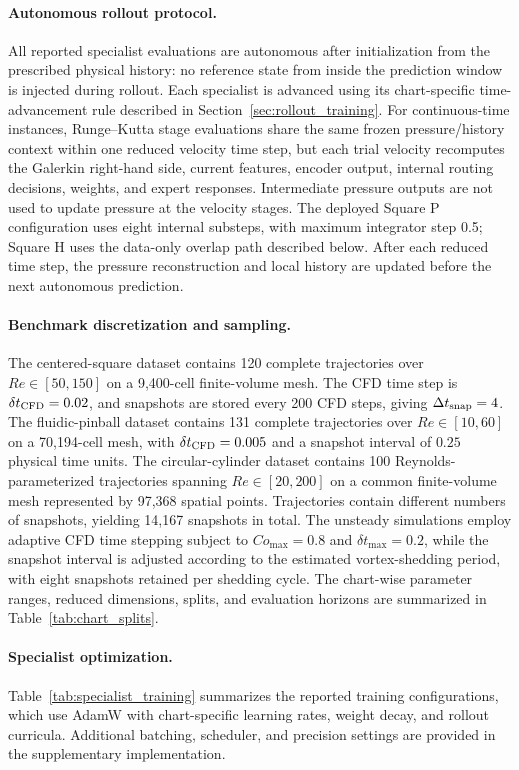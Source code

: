 \paragraph{Autonomous rollout protocol.}
All reported specialist evaluations are autonomous after initialization from the prescribed physical history: no reference state from inside the prediction window is injected during rollout.
Each specialist is advanced using its chart-specific time-advancement rule described in Section~\ref{sec:rollout_training}. For continuous-time instances, Runge--Kutta stage evaluations share the same frozen pressure/history context within one reduced velocity time step, but each trial velocity recomputes the Galerkin right-hand side, current features, encoder output, internal routing decisions, weights, and expert responses. Intermediate pressure outputs are not used to update pressure at the velocity stages. The deployed Square P configuration uses eight internal substeps, with maximum integrator step 0.5; Square H uses the data-only overlap path described below. After each reduced time step, the pressure reconstruction and local history are updated before the next autonomous prediction.


\paragraph{Benchmark discretization and sampling.}
The centered-square dataset contains 120 complete trajectories over
$Re\in[50,150]$ on a 9,400-cell finite-volume mesh. The CFD time step is $\delta t_{\rm CFD}=0.02$, and snapshots are stored every 200 CFD steps, giving $\Delta t_{\rm snap}=4$. The fluidic-pinball dataset contains 131 complete trajectories over $Re\in[10,60]$ on a 70,194-cell mesh, with $\delta t_{\rm CFD}=0.005$ and a snapshot interval of $0.25$ physical time units. The circular-cylinder dataset contains 100 Reynolds-parameterized trajectories spanning
$Re\in[20,200]$ on a common finite-volume mesh represented by 97,368 spatial points. Trajectories contain different numbers of snapshots, yielding 14,167 snapshots in total. The unsteady simulations employ adaptive CFD time stepping subject to $Co_{\max}=0.8$ and $\delta t_{\max}=0.2$, while the snapshot interval is adjusted according to the estimated vortex-shedding period, with eight snapshots retained per shedding cycle. The chart-wise parameter ranges, reduced dimensions, splits, and evaluation horizons are summarized in Table~\ref{tab:chart_splits}.


\paragraph{Specialist optimization.}
Table~\ref{tab:specialist_training} summarizes the reported training configurations, which use AdamW with chart-specific learning rates, weight decay, and rollout curricula.
Additional batching, scheduler, and precision settings are provided in the supplementary implementation.

